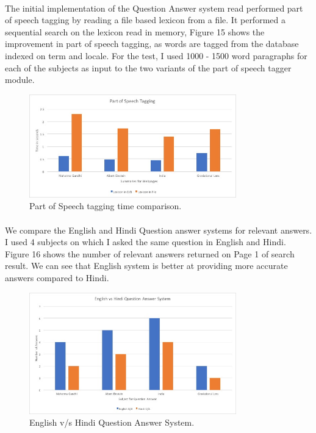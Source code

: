 \paragraph{}
The initial implementation of the Question Answer system read performed part of speech tagging by reading a file based lexicon from a file. It performed a sequential search on the lexicon read in memory, Figure 15 shows the improvement in part of speech tagging, as words are tagged from the database indexed on term and locale. For the test, I used 1000 - 1500 word paragraphs for each of the subjects as input to the two variants of the part of speech tagger module.

\begin{figure}[htb]
\centering
\includegraphics[width=0.8\textwidth]{images/QA_performance2.jpg}
\caption{Part of Speech tagging time comparison.} 
\label{fig:QA_performance2}
\end{figure}
\break

\paragraph{}
We compare the English and Hindi Question answer systems for relevant answers. I used 4 subjects on which I asked the same question in English and Hindi. Figure 16 shows the number of relevant answers returned on Page 1 of search result. We can see that English system is better at providing more accurate answers compared to Hindi.

\begin{figure}[htb]
\centering
\includegraphics[width=0.8\textwidth]{images/QA_performance3.jpg}
\caption{English v/s Hindi Question Answer System.} 
\label{fig:QA_performance3}
\end{figure}